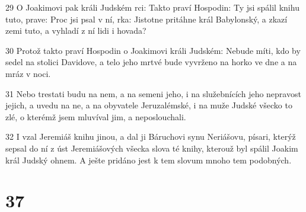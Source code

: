\par 29 O Joakimovi pak králi Judském rci: Takto praví Hospodin: Ty jsi spálil knihu tuto, prave: Proc jsi psal v ní, rka: Jistotne pritáhne král Babylonský, a zkazí zemi tuto, a vyhladí z ní lidi i hovada?
\par 30 Protož takto praví Hospodin o Joakimovi králi Judském: Nebude míti, kdo by sedel na stolici Davidove, a telo jeho mrtvé bude vyvrženo na horko ve dne a na mráz v noci.
\par 31 Nebo trestati budu na nem, a na semeni jeho, i na služebnících jeho nepravost jejich, a uvedu na ne, a na obyvatele Jeruzalémské, i na muže Judské všecko to zlé, o kterémž jsem mluvíval jim, a neposlouchali.
\par 32 I vzal Jeremiáš knihu jinou, a dal ji Báruchovi synu Neriášovu, písari, kterýž sepsal do ní z úst Jeremiášových všecka slova té knihy, kterouž byl spálil Joakim král Judský ohnem. A ješte pridáno jest k tem slovum mnoho tem podobných.

\chapter{37}

